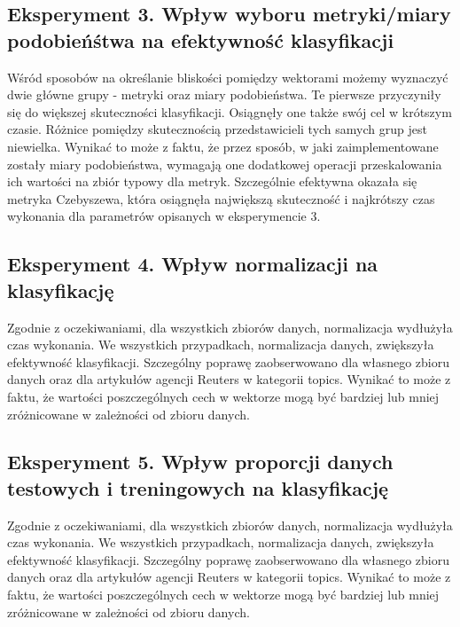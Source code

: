 \documentclass{classrep}
\begin{document}
\subsection{Eksperyment 3. Wpływ wyboru metryki/miary podobieńśtwa na efektywność klasyfikacji}
Wśród sposobów na określanie bliskości pomiędzy wektorami możemy wyznaczyć dwie główne grupy - metryki oraz miary podobieństwa. Te pierwsze przyczyniły się do większej skuteczności klasyfikacji. Osiągnęły one także swój cel w krótszym czasie. Różnice pomiędzy skutecznością przedstawicieli tych samych grup jest niewielka. Wynikać to może z faktu, że przez sposób, w jaki zaimplementowane zostały miary podobieństwa, wymagają one dodatkowej operacji przeskalowania ich wartości na zbiór typowy dla metryk. Szczególnie efektywna okazała się metryka Czebyszewa, która osiągnęła największą skuteczność i najkrótszy czas wykonania dla parametrów opisanych w eksperymencie 3. 
\subsection{Eksperyment 4. Wpływ normalizacji na klasyfikację}
Zgodnie z oczekiwaniami, dla wszystkich zbiorów danych, normalizacja wydłużyła czas wykonania. We wszystkich przypadkach, normalizacja danych, zwiększyła efektywność klasyfikacji. Szczególny poprawę zaobserwowano dla własnego zbioru danych oraz dla artykułów agencji Reuters w kategorii topics. Wynikać to może z faktu, że wartości poszczególnych cech w wektorze mogą być bardziej lub mniej zróżnicowane w zależności od zbioru danych.
\subsection{Eksperyment 5. Wpływ proporcji danych testowych i treningowych na klasyfikację}
Zgodnie z oczekiwaniami, dla wszystkich zbiorów danych, normalizacja wydłużyła czas wykonania. We wszystkich przypadkach, normalizacja danych, zwiększyła efektywność klasyfikacji. Szczególny poprawę zaobserwowano dla własnego zbioru danych oraz dla artykułów agencji Reuters w kategorii topics. Wynikać to może z faktu, że wartości poszczególnych cech w wektorze mogą być bardziej lub mniej zróżnicowane w zależności od zbioru danych.

\newpage
\end{document}
